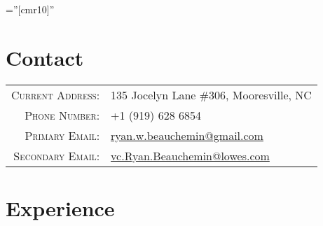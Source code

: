 \documentclass[a4paper,10pt]{article} %
\begin{document}
\pagestyle{empty} %

\font\fb=''[cmr10]'' %

\par{\par\bigskip}

\section{Contact} %

\begin{tabular}{rl}
\textsc{Current Address:} & 135 Jocelyn Lane \#306, Mooresville, NC \\
\textsc{Phone Number:} & +1 (919) 628 6854\\
\textsc{Primary Email:} & \href{mailto:ryan.w.beauchemin@gmail.com}{ryan.w.beauchemin@gmail.com}\\
\textsc{Secondary Email:} & \href{mailto:vc.Ryan.Beauchemin@lowes.com}{vc.Ryan.Beauchemin@lowes.com}\\
\end{tabular}
\bigskip


\section{Experience} %
\end{document}
